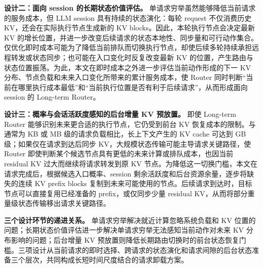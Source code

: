 \noindent\textbf{设计二：面向 session 的长期状态价值评估。}
单请求穷举虽然能够降低当前请求的服务成本，但 LLM session 具有持续的状态演化：每轮 request 不仅消费历史 KV，还会在实际执行节点生成新的 KV blocks。因此，本轮执行节点会决定最新 KV 的增长位置，并进一步改变后续请求的状态本地性、同步量和可行动作集合。仅优化即时成本可能为了降低当前排队而切换执行节点，却使后续多轮持续承担远程转发或状态同步；也可能在入口变化时反复改变最新 KV 的位置，产生路由与状态位置振荡。为此，本文在即时成本之外进一步评估当前动作形成的下一 KV 分布、节点负载和未来入口变化所带来的累计服务成本，使 Router 同时判断“当前在哪里执行成本最低”和“当前执行位置是否有利于后续请求”，从而形成面向 session 的 Long-term Router。

\noindent\textbf{设计三：概率与会话活跃度感知的后台增量 KV 预放置。}
即使 Long-term Router 能够识别未来更合适的执行节点，它仍受到前台 KV 恢复成本的限制。与通常为 KB 或 MB 级的请求负载相比，长上下文产生的 KV cache 可达到 GB 级；如果仅在请求到达后同步 KV，大规模状态传输可能主导请求关键路径，使 Router 即使判断某个候选节点具有更低的未来计算或排队成本，也因当前 residual KV 过大而继续将请求转发到原 KV 节点。为降低这一切换门槛，本文在请求完成后，根据候选入口概率、session 剩余活跃度和后台资源余量，逐步将缺失的连续 KV prefix blocks 复制到未来可能使用的节点。后续请求到达时，目标节点可以直接复用已经准备的 prefix，或仅同步少量 residual KV，从而将部分重量级状态传输移出请求关键路径。

\noindent\textbf{三个设计环节的递进关系。}
单请求穷举解决就近计算忽略系统负载和 KV 位置的问题；长期状态价值评估进一步解决单请求穷举无法感知当前动作对未来 KV 分布影响的问题；后台增量 KV 预放置则降低长期路由切换时的前台状态恢复门槛。三项设计从当前请求的即时选择、跨请求的状态演化和请求间隙的后台状态准备三个层次，共同构成长短时间尺度结合的请求卸载方案。

